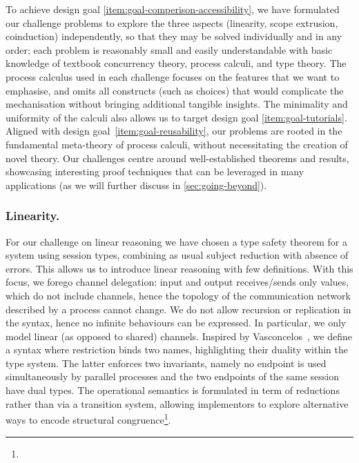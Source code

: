 \documentclass[runningheads]{llncs}
\begin{document}
To achieve design goal \ref{item:goal-comperison-accessibility}, we have
formulated our challenge problems to explore the three aspects
(linearity, scope extrusion, coinduction) independently, so that they
may be solved individually and in any order; each problem is
reasonably small and easily understandable with basic knowledge of
textbook concurrency theory, process calculi, and type theory.  The
process calculus used in each challenge focuses on the features that
we want to emphasise, and omits all constructs (such as choices) that
would complicate the mechanisation without bringing additional
tangible insights.  The minimality and uniformity of the
calculi also allows us to target design goal
\ref{item:goal-tutorials}.
Aligned with design goal~\ref{item:goal-reusability}, our problems are rooted in the fundamental meta-theory of process calculi, without necessitating the creation of novel theory.
Our challenges centre around well-established theorems and results, showcasing interesting proof techniques that can be leveraged in many applications (as we will further discuss in \cref{sec:going-beyond}).

\subsubsection{Linearity.}




For our challenge on linear reasoning we have chosen a type safety
theorem for a system using session types, combining as usual subject reduction with absence of errors.  This allows us to introduce
linear reasoning with few definitions.  With this focus, we forego
channel delegation: input and output receives/sends only values, which
do not include channels, hence the topology of the communication
network described by a process cannot change.  We do not allow
recursion or replication in the syntax, hence no infinite behaviours
can be expressed. In particular, we only model linear (as opposed to
shared) channels. Inspired by Vasconcelos~\cite{Vasconcelos2012}, we
define a syntax where restriction binds two names, highlighting their
duality within the type system. The latter enforces
 two invariants, namely no endpoint is used simultaneously by parallel processes and
 the two endpoints of the same session have dual types.
The operational semantics is formulated in term of reductions rather
than via a transition system, allowing implementors to explore
alternative ways to encode structural congruence\footnote{}.
\end{document}
